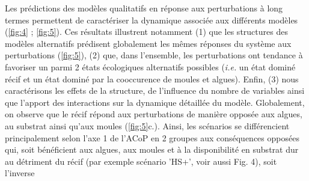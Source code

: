 \documentclass[12pt]{report}
\begin{document}
Les prédictions des modèles qualitatifs en réponse aux perturbations à long termes permettent de caractériser la dynamique associée aux différents modèles (\autoref{fig:4} ; \autoref{fig:5}). Ces résultats illustrent notamment (1) que les structures des modèles alternatifs prédisent globalement les mêmes réponses du système aux perturbations (\autoref{fig:5}), (2) que, dans l’ensemble, les perturbations ont tendance à favoriser un parmi 2 états écologiques alternatifs possibles (\textit{i.e.} un état dominé récif et un état dominé par la cooccurence de moules et algues). 
Enfin, (3) nous caractérisons les effets de la structure, de l’influence du nombre de variables ainsi que l’apport des interactions sur la dynamique détaillée du modèle. Globalement, on observe que le récif répond aux perturbations de manière opposée aux algues, au substrat ainsi qu’aux moules (\autoref{fig:5}c.). 
\newline\newline
Ainsi, les scénarios se différencient principalement selon l'axe 1 de l'ACoP en 2 groupes aux conséquences opposées qui, soit bénéficient aux algues, aux moules et à la disponibilité en substrat dur au détriment du récif (par exemple scénario 'HS+', voir aussi Fig. 4), soit l'inverse 
\end{document}
